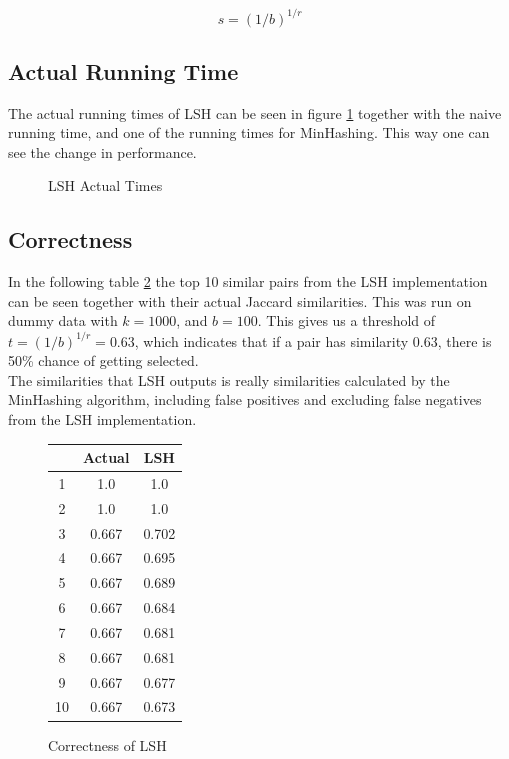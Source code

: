 \documentclass[a4paper,11pt]{article}
\begin{document}
\begin{equation}
    s = (1/b)^{1/r}
    \label{eq:s-estimate}
\end{equation}


\subsection{Actual Running Time}
The actual running times of LSH can be seen in figure \ref{fig:lsh_at} together with the naive running time, and one of the running times for MinHashing. This way one can see the change in performance.

\begin{figure}[H]
    \begin{center}
        
        \caption{LSH Actual Times}
        \label{fig:lsh_at}
    \end{center}
\end{figure}

\subsection{Correctness}
In the following table \ref{tab:lsh-correctness} the top 10 similar pairs from the LSH implementation can be seen together with their actual Jaccard similarities. This was run on dummy data with $k = 1000$, and $b = 100$. This gives us a threshold of $t = (1/b)^{1/r} = 0.63$, which indicates that if a pair has similarity 0.63, there is 50\% chance of getting selected.  \\

The similarities that LSH outputs is really similarities calculated by the MinHashing algorithm, including false positives and excluding false negatives from the LSH implementation. \\

\begin{figure}[H]
    \begin{center}
        \begin{tabular}{c|c|c}
              & Actual & LSH \\
            \hline
            1 & 1.0 & 1.0 \\
            2 & 1.0  & 1.0 \\
            3 & 0.667 & 0.702 \\
            4 & 0.667 & 0.695 \\
            5 & 0.667 & 0.689 \\
            6 & 0.667 & 0.684 \\
            7 & 0.667 & 0.681 \\
            8 & 0.667 & 0.681 \\
            9 & 0.667 & 0.677 \\
            10 & 0.667 & 0.673 
        \end{tabular}
        \caption{Correctness of LSH}
        \label{tab:lsh-correctness}
    \end{center}
\end{figure}
\end{document}
